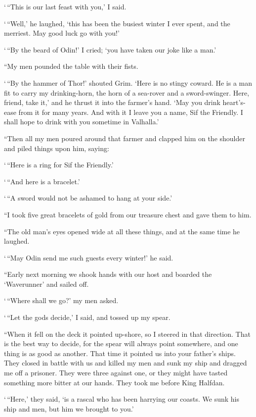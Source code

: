 `\,``This is our last feast with you,' I said.

`\,``Well,' he laughed, `this has been the busiest winter I ever spent, and
the merriest. May good luck go with you!'

`\,``By the beard of Odin!' I cried; `you have taken our joke like a man.'

``My men pounded the table with their fists.

`\,``By the hammer of Thor!' shouted Grim. `Here is no stingy coward. He is
a man fit to carry my drinking-horn, the horn of a sea-rover and a
sword-swinger. Here, friend, take it,' and he thrust it into the
farmer's hand. `May you drink heart's-ease from it for many years. And
with it I leave you a name, Sif the Friendly. I shall hope to drink with
you sometime in Valhalla.'

``Then all my men poured around that farmer and clapped him on the
shoulder and piled things upon him, saying:

`\,``Here is a ring for Sif the Friendly.'

`\,``And here is a bracelet.'

`\,``A sword would not be ashamed to hang at your side.'

``I took five great bracelets of gold from our treasure chest and gave
them to him.

``The old man's eyes opened wide at all these things, and at the same
time he laughed.

`\,``May Odin send me such guests every winter!' he said.

``Early next morning we shook hands with our host and boarded the
`Waverunner' and sailed off.

`\,``Where shall we go?' my men asked.

`\,``Let the gods decide,' I said, and tossed up my spear.

``When it fell on the deck it pointed up-shore, so I steered in that
direction. That is the best way to decide, for the spear will always
point somewhere, and one thing is as good as another. That time it
pointed us into your father's ships. They closed in battle with us and
killed my men and sunk my ship and dragged me off a prisoner. They were
three against one, or they might have tasted something more bitter at
our hands. They took me before King Halfdan.

`\,``Here,' they said, `is a rascal who has been harrying our coasts. We
sunk his ship and men, but him we brought to you.'

